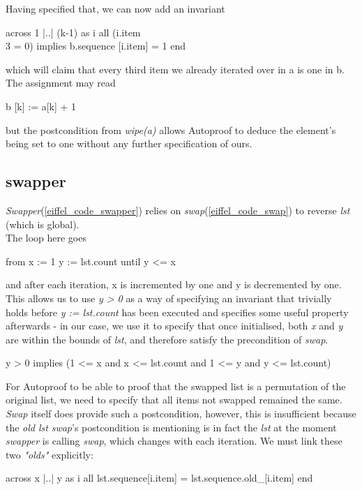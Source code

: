 Having specified that, we can now add an invariant
\begin{eSimple}
across 1 |..| (k-1) as i all
	(i.item \\ 3 = 0) implies
		b.sequence [i.item] = 1 end
\end{eSimple}
which will claim that every third item we already iterated over in a is one in b. The assignment may read
\begin{eSimple}
b [k] := a[k] + 1
\end{eSimple}
but the postcondition from \emph{wipe(a)} allows Autoproof to deduce the element's being set to one without any further specification of ours.\\

\subsection{swapper}
\emph{Swapper}(\ref{eiffel_code_swapper}) relies on \emph{swap}(\ref{eiffel_code_swap}) to reverse \emph{lst} (which is global).\\

The loop here goes
\begin{eSimple}
from
	x := 1
	y := lst.count
until
	y <= x
\end{eSimple}

and after each iteration, x is incremented by one and y is decremented by one. This allows us to use \emph{y > 0} as a way of specifying an invariant that trivially holds before \emph{y := lst.count} has been executed and specifies some useful property afterwards - in our case, we use it to specify that once initialised, both \emph{x} and \emph{y} are within the bounds of \emph{lst}, and therefore satisfy the precondition of \emph{swap}.
\begin{eSimple}
y > 0 implies (1 <= x and x <= lst.count and 1 <= y and y <= lst.count)
\end{eSimple}

For Autoproof to be able to proof that the swapped list is a permutation of the original list, we need to specify that all items not swapped remained the same. \emph{Swap} itself does provide such a postcondition, however, this is insufficient because the \emph{old lst} \emph{swap}'s postcondition is mentioning is in fact the \emph{lst} at the moment \emph{swapper} is calling \emph{swap}, which changes with each iteration. We must link these two \emph{"olds"} explicitly:
\begin{eSimple}
across x |..| y as i all lst.sequence[i.item] =
	lst.sequence.old_[i.item] end
\end{eSimple}

